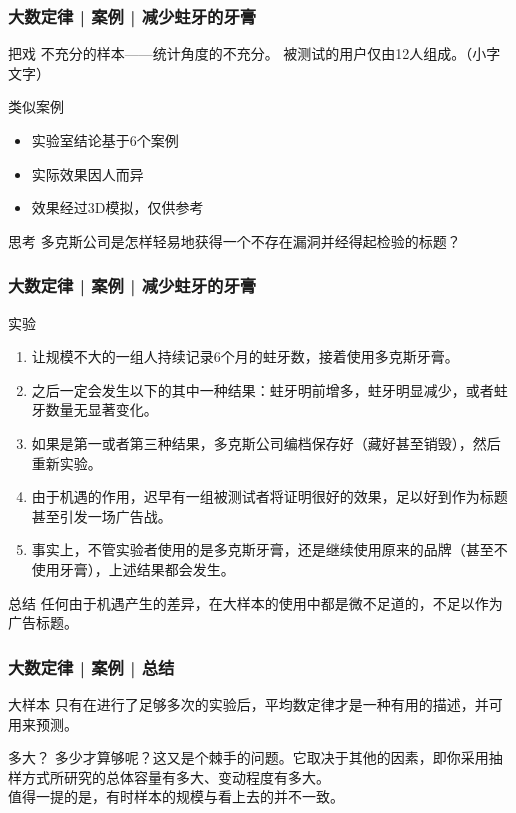 \begin{frame}
  \frametitle{大数定律 | 案例 | 减少蛀牙的牙膏}
  \begin{block}{把戏}
    不充分的样本——统计角度的不充分。
    被测试的用户仅由12人组成。（小字文字）
  \end{block}
  \pause
  \begin{block}{类似案例}
    \begin{itemize}
      \item 实验室结论基于6个案例
      \item 实际效果因人而异
      \item 效果经过3D模拟，仅供参考
    \end{itemize}
  \end{block}
  \pause
  \begin{block}{思考}
    多克斯公司是怎样轻易地获得一个不存在漏洞并经得起检验的标题？
  \end{block}
\end{frame}

\begin{frame}
  \frametitle{大数定律 | 案例 | 减少蛀牙的牙膏}
  \begin{block}{实验}
    \begin{enumerate}
      \item 让规模不大的一组人持续记录6个月的蛀牙数，接着使用多克斯牙膏。
      \item 之后一定会发生以下的其中一种结果：蛀牙明前增多，蛀牙明显减少，或者蛀牙数量无显著变化。
      \item 如果是第一或者第三种结果，多克斯公司编档保存好（藏好甚至销毁），然后重新实验。
      \item 由于机遇的作用，迟早有一组被测试者将证明很好的效果，足以好到作为标题甚至引发一场广告战。
      \item 事实上，不管实验者使用的是多克斯牙膏，还是继续使用原来的品牌（甚至不使用牙膏），上述结果都会发生。
    \end{enumerate}
  \end{block}
  \pause
  \vspace{-0.5em}
  \begin{block}{总结}
    任何由于机遇产生的差异，在大样本的使用中都是微不足道的，不足以作为广告标题。
  \end{block}
\end{frame}

\begin{frame}
  \frametitle{大数定律 | 案例 | 总结}
  \begin{block}{大样本}
    只有在进行了足够多次的实验后，平均数定律才是一种有用的描述，并可用来预测。
  \end{block}
  \pause
  \begin{block}{多大？}
    多少才算够呢？这又是个棘手的问题。它取决于其他的因素，即你采用抽样方式所研究的总体容量有多大、变动程度有多大。\\
    \vspace{0.5em}
    值得一提的是，有时样本的规模与看上去的并不一致。
  \end{block}
\end{frame}

